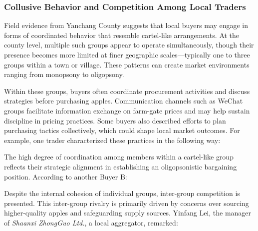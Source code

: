\subsubsection{Collusive Behavior and Competition Among Local Traders}
\noindent 
Field evidence from Yanchang County suggests that local buyers may engage in forms of coordinated behavior that resemble cartel-like arrangements. At the county level, multiple such groups appear to operate simultaneously, though their presence becomes more limited at finer geographic scales—typically one to three groups within a town or village. These patterns can create market environments ranging from monopsony to oligopsony.

Within these groups, buyers often coordinate procurement activities and discuss strategies before purchasing apples. Communication channels such as WeChat groups facilitate information exchange on farm-gate prices and may help sustain discipline in pricing practices. Some buyers also described efforts to plan purchasing tactics collectively, which could shape local market outcomes. For example, one trader characterized these practices in the following way:

\begin{quote}
\end{quote}

The high degree of coordination among members within a cartel-like group reflects their strategic alignment in establishing an oligopsonistic bargaining position. According to another Buyer B:

\begin{quote}
\end{quote}

Despite the internal cohesion of individual groups, inter-group competition is presented. This inter-group rivalry is primarily driven by concerns over sourcing higher-quality apples and safeguarding supply sources. Yinfang Lei, the manager of \textit{Shaanxi ZhongGuo Ltd.}, a local aggregator, remarked:

